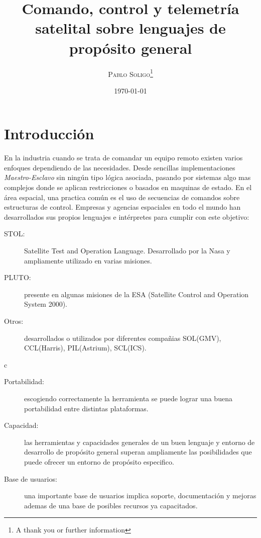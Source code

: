 \documentclass[twoside,twocolumn]{article}
\title{Comando, control y telemetría satelital sobre lenguajes de propósito general} %
\author{%
\textsc{Pablo Soligo}\thanks{A thank you or further information} \\[1ex] %
}
\date{\today} %
\begin{document}
\maketitle


\section{Introducción}

En la industria cuando se trata de comandar un equipo remoto existen varios enfoques dependiendo de las necesidades. Desde sencillas implementaciones \textit{Maestro-Esclavo} sin ningún tipo lógica asociada, pasando por sistemas algo mas complejos donde se aplican restricciones o basados en maquinas de estado. En el área espacial, una practica común es el uso de secuencias de comandos sobre estructuras de control. Empresas y agencias espaciales en todo el mundo han desarrollados sus propios lenguajes e intérpretes para cumplir con este objetivo: 

\begin{description}
 \item [STOL:] Satellite Test and Operation Language. Desarrollado por la Nasa y ampliamente utilizado en varias misiones. 
 \item [PLUTO:] presente en algunas misiones de la ESA (Satellite Control and Operation System 2000).
 \item [Otros:] desarrollados o utilizados por diferentes compañias  SOL(GMV), CCL(Harris), PIL(Astrium), SCL(ICS). 
\end{description}


c

\begin{description}
 \item [Portabilidad: ] escogiendo correctamente la herramienta se puede lograr una buena portabilidad entre distintas plataformas.
 \item [Capacidad: ] las herramientas y capacidades generales de un buen lenguaje y entorno de desarrollo de propósito general superan ampliamente las posibilidades que puede ofrecer un entorno de propósito especifico.
 \item [Base de usuarios: ] una importante base de usuarios implica soporte, documentación y mejoras ademas de una base de posibles recursos ya capacitados. 
\end{description}
\end{document}
